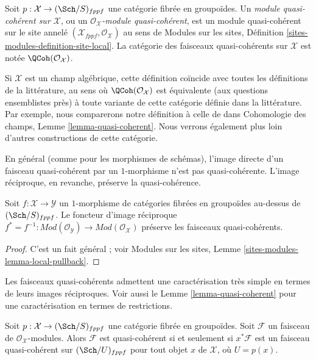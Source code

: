 \begin{definition}
\label{definition-quasi-coherent}
Soit $p : \mathcal{X} \to (\Sch/S)_{fppf}$ une catégorie fibrée
en groupoïdes. Un {\it module quasi-cohérent sur $\mathcal{X}$}, ou un
{\it $\mathcal{O}_\mathcal{X}$-module quasi-cohérent}, est un
module quasi-cohérent sur le site annelé
$(\mathcal{X}_{fppf}, \mathcal{O}_\mathcal{X})$ au sens de
Modules sur les sites, Définition \ref{sites-modules-definition-site-local}.
La catégorie des faisceaux quasi-cohérents sur $\mathcal{X}$
est notée $\QCoh(\mathcal{O}_\mathcal{X})$.
\end{definition}

\noindent
Si $\mathcal{X}$ est un champ algébrique, cette définition coïncide avec toutes les
définitions de la littérature, au sens où $\QCoh(\mathcal{O}_\mathcal{X})$
est équivalente (aux questions ensemblistes près) à toute variante de cette catégorie
définie dans la littérature. Par exemple, nous comparerons notre définition à
celle de \cite[Définition 6.1]{olsson_sheaves} dans
Cohomologie des champs, Lemme \ref{lemma-quasi-coherent}.
Nous verrons également plus loin d'autres constructions de cette catégorie.

\medskip\noindent
En général (comme pour les morphismes de schémas), l'image directe
d'un faisceau quasi-cohérent par un $1$-morphisme n'est pas quasi-cohérente.
L'image réciproque, en revanche, préserve la quasi-cohérence.

\begin{lemma}
\label{lemma-pullback-quasi-coherent}
Soit $f : \mathcal{X} \to \mathcal{Y}$ un $1$-morphisme de catégories
fibrées en groupoïdes au-dessus de $(\Sch/S)_{fppf}$.
Le foncteur d'image réciproque
$f^* = f^{-1} : \textit{Mod}(\mathcal{O}_\mathcal{Y}) \to
\textit{Mod}(\mathcal{O}_\mathcal{X})$
préserve les faisceaux quasi-cohérents.
\end{lemma}

\begin{proof}
C'est un fait général ; voir
Modules sur les sites, Lemme \ref{sites-modules-lemma-local-pullback}.
\end{proof}

\noindent
Les faisceaux quasi-cohérents admettent une caractérisation très simple
en termes de leurs images réciproques. Voir aussi le
Lemme \ref{lemma-quasi-coherent}
pour une caractérisation en termes de restrictions.

\begin{lemma}
\label{lemma-characterize-quasi-coherent}
Soit $p : \mathcal{X} \to (\Sch/S)_{fppf}$ une catégorie
fibrée en groupoïdes. Soit $\mathcal{F}$
un faisceau de $\mathcal{O}_\mathcal{X}$-modules. Alors $\mathcal{F}$
est quasi-cohérent si et seulement si $x^*\mathcal{F}$ est un faisceau
quasi-cohérent sur $(\Sch/U)_{fppf}$ pour tout objet $x$ de
$\mathcal{X}$, où $U = p(x)$.
\end{lemma}

